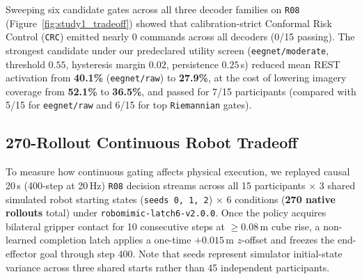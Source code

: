 \documentclass{article}
\begin{document}
Sweeping six candidate gates across all three decoder families on \texttt{R08} (Figure~\ref{fig:study1_tradeoff}) showed that calibration-strict Conformal Risk Control (\texttt{CRC}) emitted nearly 0 commands across all decoders (0/15 passing). The strongest candidate under our predeclared utility screen (\texttt{eegnet/moderate}, threshold $0.55$, hysteresis margin $0.02$, persistence $0.25$\,s) reduced mean REST activation from \textbf{40.1\%} (\texttt{eegnet/raw}) to \textbf{27.9\%}, at the cost of lowering imagery coverage from \textbf{52.1\%} to \textbf{36.5\%}, and passed for 7/15 participants (compared with 5/15 for \texttt{eegnet/raw} and 6/15 for top \texttt{Riemannian} gates).

\subsection{270-Rollout Continuous Robot Tradeoff}

To measure how continuous gating affects physical execution, we replayed causal 20\,s (400-step at 20\,Hz) \texttt{R08} decision streams across all 15 participants $\times$ 3 shared simulated robot starting states (\texttt{seeds 0, 1, 2}) $\times$ 6 conditions (\textbf{270 native rollouts} total) under \texttt{robomimic-latch6-v2.0.0}. Once the policy acquires bilateral gripper contact for 10 consecutive steps at $\ge 0.08$\,m cube rise, a non-learned completion latch applies a one-time $+0.015$\,m $z$-offset and freezes the end-effector goal through step 400. Note that seeds represent simulator initial-state variance across three shared starts rather than 45 independent participants.
\end{document}
